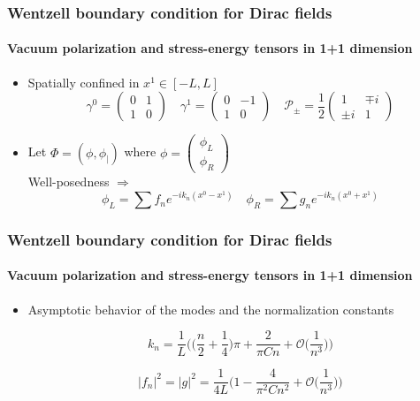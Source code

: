 \documentclass[french]{beamer}
\begin{document}
\begin{frame}
\frametitle{Wentzell boundary condition for Dirac fields}
\framesubtitle{Vacuum polarization and stress-energy tensors in 1+1 dimension}

\begin{itemize}

\item Spatially confined in $x^1 \in [-L, L]$
\begin{equation*}
\gamma^0 = \begin{pmatrix} 0 & 1 \\ 1 & 0 \end{pmatrix} \quad
\gamma^1 = \begin{pmatrix} 0 & -1 \\ 1 & 0 \end{pmatrix}
\quad
 \mathcal{P}_\pm = \frac 1 2  \begin{pmatrix} 1 & \mp i \\ \pm i & 1 \end{pmatrix}
\end{equation*}

\item Let $\Phi = (\phi, \phi_|)$ where $\phi = \begin{pmatrix} \phi_L \\ \phi_R \end{pmatrix}$ \\
Well-posedness $\Longrightarrow$
\begin{equation*}
\phi_L = \sum f_n e^{-ik_n(x^0 - x^1)} \quad
\phi_R = \sum g_n e^{-ik_n(x^0 + x^1)}
\end{equation*}
\end{itemize}
\end{frame}
\begin{frame}
\frametitle{Wentzell boundary condition for Dirac fields}
\framesubtitle{Vacuum polarization and stress-energy tensors in 1+1 dimension}

\begin{itemize}
\item Asymptotic behavior of the modes and the normalization constants

\begin{equation*}
k_n = \frac 1 L \Big( \big( \frac n 2 + \frac 1 4 \big)\pi + \frac{2}{\pi C n}+ \mathcal{O}\big(\frac{1}{n^3}\big) \Big)
\end{equation*}

\begin{equation*}
|f_n|^2 = |g|^2=
\frac{1}{4L}\Big( 1 - \frac{4}{\pi^2C n^2} + \mathcal{O}\big(\frac{1}{n^3}\big) \Big)
\end{equation*}


\end{itemize}
\end{frame}
\end{document}
